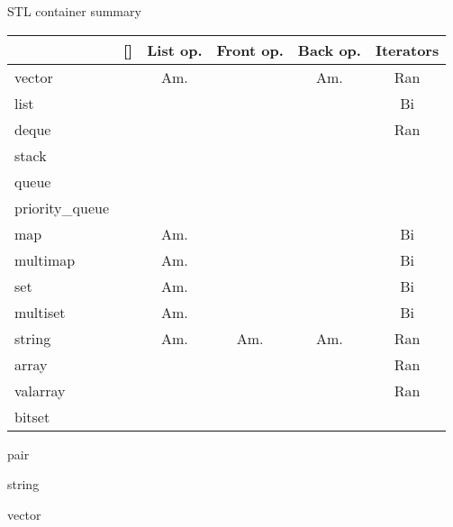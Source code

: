 \categorycontents{}
\newpage

\begin{algorithm}{STL container summary}
\desc
\begin{tabular}{|l|ccccc|}
\hline
 & [] & List op. & Front op. & Back op. & Iterators \\
\hline
vector & \ordo{1} & Am. \ordo{n} &          & Am. \ordo{1} & Ran \\
list   &          & \ordo{1}     & \ordo{1} & \ordo{1}     & Bi \\
deque  & \ordo{1} & \ordo{n}     & \ordo{1} & \ordo{1}     & Ran \\
\hline
stack           & & &                & \ordo{1}       & \\
queue           & & & \ordo{1}       & \ordo{1}       & \\
priority\_queue & & & \ordo{\log{n}} & \ordo{\log{n}} & \\
\hline
map      & \ordo{\log{n}} & Am. \ordo{\log{n}} & & & Bi \\
multimap &                & Am. \ordo{\log{n}} & & & Bi \\
set      &                & Am. \ordo{\log{n}} & & & Bi \\
multiset &                & Am. \ordo{\log{n}} & & & Bi \\
\hline
string   & \ordo{1} & Am. \ordo{n} & Am. \ordo{n} & Am. \ordo{1} & Ran \\
array    & \ordo{1} &              &              &              & Ran \\
valarray & \ordo{1} &              &              &              & Ran \\
bitset   & \ordo{1} &              &              &              & \\
\hline
\end{tabular}
\end{algorithm}

\begin{algorithm}{pair}
\end{algorithm}

\begin{algorithm}{string}
\end{algorithm}

\begin{algorithm}{vector}
\end{algorithm}

